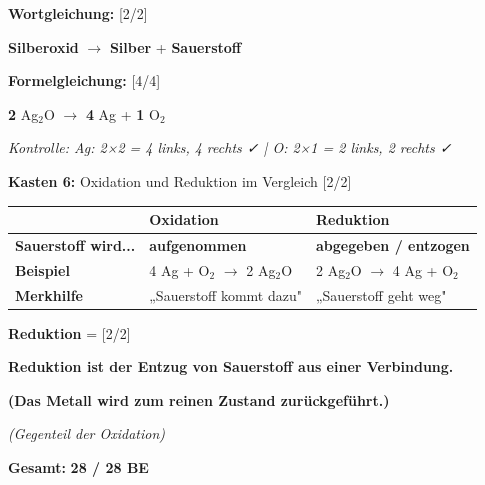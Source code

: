 \documentclass[10pt, a4paper]{article}
\newcommand{\maxpunkte}{28}
\newcommand{\lsg}[1]{\textcolor{loesung}{\textbf{#1}}}
\newcommand{\punktebox}[1]{\hfill\small\textcolor{mittelgrau}{[#1/#1]}}
\newcommand{\kasten}[2]{%
    \vspace{6pt}%
    \noindent\textbf{\textcolor{fachfarbe}{Kasten #1:}} #2%
    \vspace{3pt}%
    \nopagebreak[4]%
}
\begin{document}
\begin{merkkasten}

\textbf{Wortgleichung:} \punktebox{2}

\vspace{2pt}
\hspace{2em} \lsg{Silberoxid} $\longrightarrow$ \lsg{Silber} + \lsg{Sauerstoff}

\vspace{8pt}
\textbf{Formelgleichung:} \punktebox{4}

\vspace{2pt}
\hspace{2em} \lsg{2} Ag$_2$O $\longrightarrow$ \lsg{4} Ag + \lsg{1} O$_2$

\vspace{4pt}
{\small\textit{Kontrolle: Ag: 2×2 = 4 links, 4 rechts ✓ | O: 2×1 = 2 links, 2 rechts ✓}}

\end{merkkasten}

\vspace{4pt}


\kasten{6}{Oxidation und Reduktion im Vergleich} \punktebox{2}

\vspace{4pt}

\begin{tabular}{|p{4cm}|p{5.5cm}|p{5.5cm}|}
\hline
& \textbf{Oxidation} & \textbf{Reduktion} \\
\hline
\textbf{Sauerstoff wird...} & \lsg{aufgenommen} & \lsg{abgegeben / entzogen} \\
\hline
\textbf{Beispiel} & 4 Ag + O$_2$ $\rightarrow$ 2 Ag$_2$O & 2 Ag$_2$O $\rightarrow$ 4 Ag + O$_2$ \\
\hline
\textbf{Merkhilfe} & „Sauerstoff kommt dazu" & „Sauerstoff geht weg" \\
\hline
\end{tabular}

\vspace{6pt}


\begin{merkkasten}

\vspace{2pt}
\textbf{\textcolor{fachfarbe}{Reduktion}} = \punktebox{2}

\vspace{4pt}
\lsg{Reduktion ist der Entzug von Sauerstoff aus einer Verbindung.}

\lsg{(Das Metall wird zum reinen Zustand zurückgeführt.)}

\vspace{2pt}
{\small\textit{(Gegenteil der Oxidation)}}

\end{merkkasten}


\vfill

\begin{center}
{\small\textbf{Gesamt:} \lsg{\maxpunkte{} / \maxpunkte{} BE}}
\end{center}
\end{document}
